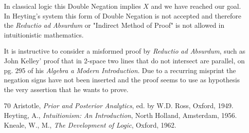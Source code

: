 \documentclass[12pt]{article}
\begin{document}
In classical logic this Double Negation implies $X$ and we have reached our goal. In Heyting's system this form of Double Negation is not accepted and therefore the \emph{Reductio ad Absurdum} or "Indirect Method of Proof" is not allowed in intuitionistic mathematics.

It is instructive to consider a misformed proof by \emph{Reductio ad Absurdum}, such as John Kelley' proof that in 2-space two lines that do not intersect are parallel, on pg. 295 of his \emph{Algebra a Modern Introduction}. Due to a recurring misprint the negation signs have not been inserted and the proof seems to use as hypothesis the very assertion that he wants to prove.

\vspace{2mm}

\begin{thebibliography} {70}
 Aristotle, \emph{Prior and Posterior Analytics}, ed. by W.D. Ross, Oxford, 1949.
 Heyting, A., \emph{Intuitionism: An Introduction}, North Holland, Amsterdam, 1956.
 Kneale, W., M., \emph{The Development of Logic}, Oxford, 1962.
\end{thebibliography}
\end{document}
